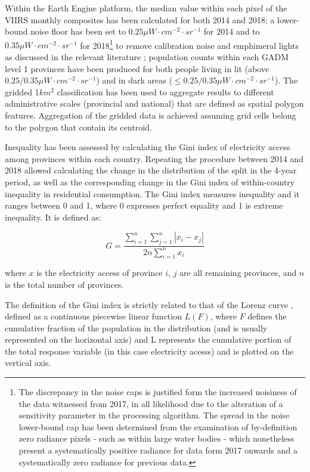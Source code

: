 \documentclass[preprint,12pt]{elsarticle}
\begin{document}
Within the Earth Engine platform, the median value within each pixel of the VIIRS monthly composites has been calculated for both 2014 and 2018; a lower-bound noise floor has been set to $0.25 \mu W \cdot cm^{-2} \cdot sr^{-1}$ for 2014 and to $0.35 \mu W \cdot cm^{-2} \cdot sr^{-1}$ for 2018\footnote{The discrepancy in the noise caps is justified form the increased noisiness of the data witnessed from 2017, in all likelihood due to the alteration of a sensitivity parameter in the processing algorithm. The spread in the noise lower-bound cap has been determined from the examination of by-definition zero radiance pixels - such as within large water bodies - which nonetheless present a systematically positive radiance for data form 2017 onwards and a systematically zero radiance for previous data.} to remove calibration noise and emphimeral lights as discussed in the relevant literature \citep{roman_holidays_2015, levin_global_2017}; population counts within each GADM level 1 provinces have been produced for both people living in lit (above $0.25 / 0.35 \mu W \cdot cm^{-2} \cdot sr^{-1}$)  and in dark areas ($ \leq 0.25 / 0.35 \mu W \cdot cm^{-2} \cdot sr^{-1}$). The gridded 1$km^2$ classification has been used to aggregate results to different administrative scales (provincial and national) that are defined as spatial polygon features. Aggregation of the gridded data is achieved assuming grid cells belong to the polygon that contain its centroid. 

Inequality has been assessed by calculating the Gini index of electricity access among provinces within each country. Repeating the procedure between 2014 and 2018 allowed calculating the change in the distribution of the split in the 4-year period, as well as the corresponding change in the Gini index of within-country inequality in residential consumption. The Gini index measures inequality and it ranges between 0 and 1, where 0 expresses perfect equality and 1 is extreme inequality. It is defined as:

\begin{equation}
  G  = \frac { \sum _ { i = 1 } ^ { n } \sum _ { j = 1 } ^ { n } \left| x _ { i } - x _ { j } \right| } { 2 n \sum _ { i = 1 } ^ { n } x _ { i } }
\end{equation}

where $x$ is the electricity access of province $i$, $j$ are all remaining provinces, and $n$ is the total number of provinces. 

The definition of the Gini index is strictly related to that of the Lorenz curve \citep{lorenz1905methods}, defined as a continuous piecewise linear function $L(F)$, where $F$ defines the cumulative fraction of the population in the distribution (and is usually represented on the horizontal axis) and L represents the cumulative portion of the total response variable (in this case electricity acesss) and is plotted on the vertical axis.
\end{document}

